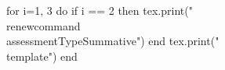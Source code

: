 \documentclass[twoside, 10pt]{article}
\title{}
\date{}
\newcommand{\assessmentType}{Formative}
\newcommand{\template}{
\directlua{tex.print(utils.genVersion())}
\noindent
{\large
First Name \rule{8em}{.4pt}\hspace{\stretch{1}} Last Name \rule{8em}{.4pt}\hspace{\stretch{1}} Date \rule{1.5em}{.4pt} -- \rule{1.5em}{.4pt} -- \rule{1.5em}{.4pt}\hspace{\stretch{1}} Period \rule{2em}{.4pt}\hspace{\stretch{1}}
}
\vspace{1em}

\noindent
\renewcommand{\arraystretch}{2}
\begin{tabular}{|l|l|l|}
\hline
\textbf{ARGUE}&\textbf{MODEL}&\textbf{BE PRECISE}\\
\hline
&&\\
\hline
\end{tabular}

\begin{enumerate}
\section*{\normalsize Be Precise.}
\item Let $p(x)$ and $d(x) \ne 0$ be polynomials. If $p(x) = q(x)\cdot d(x) + r(x)$, then when $p(x)$ is divided by $d(x)$, the quotient is \rule{3em}{0.4pt}, and the remainder is \rule{3em}{0.4pt}.
\item  The Remainder Theorem: The remainder of $p(x)$ divided by $(x-a)$ is \rule{4em}{0.4pt}.
\item A \textbf{rational function} is a quotient of two \rule{10em}{0.4pt}.
\item A \textbf{rational number} is a quotient of two  \rule{10em}{0.4pt}.
\item Complete the following exponent rules: Given $a > 0$,
\vspace{1em}

(a) 
$a^m \cdot a^n = \rule{3em}{0.4pt}.$\hspace{\stretch{1}}
(b) 
$a^{-n} = \rule{3em}{0.4pt}.$\hspace{\stretch{1}}
(c) 
$a^{\frac{1}{n}} = \rule{3em}{0.4pt}.$\hspace{\stretch{1}}
(d) 
$(a^m)^n = \rule{3em}{0.4pt}.$\hspace{\stretch{1}}
(e) 
$(ab)^n = \rule{3em}{0.4pt}.$
\item If $f(x) = (x-a)(x-b)(x-c)$, then the zeros of $f(x)$ are \rule{10em}{0.4pt}.

\section*{\normalsize Model. }
\item Choose one set of problems (either \textbf{Recap} or \textbf{Rebuild}) to solve. \textbf{Circle the label of the problem set.}
{\bf Rebuild:}
\begin{enumerate}
\item 
\directlua{x = utils.genRandom(2, 10); y = x + utils.genRandom(1,5); total = 0.25*x + 0.1*y;}
Josie has \$\directlua{tex.print(total)} in dimes and quarters. She has \directlua{tex.print(y-x)} more dimes than quarters. Establish an equation that can be used to determine $x$, the number of quarters she has.
\item Vince wants to rent a canoe while he is on vacation. The canoe rental company charges \$18 for the first hour and \$\directlua{price=toFix(utils.genRandom(10,20)/2, 2); tex.print(price)} for each additional hour, x. If Vince has \$78 to spend on renting a canoe, write an inequality in terms of $x$ that models this situation.
\end{enumerate}
{\bf Recap:}
\begin{enumerate}
\item \directlua{num=utils.genRandom(1, 9); den=utils.genRandom(num, 20)} Find the number that is $\displaystyle \frac{\directlua{tex.print(num)}}{\directlua{tex.print(den)}}$ less than its reciprocal. (Hint: recall that the reciprocal of $x$ is just $\displaystyle \frac{1}{x}$.
\end{enumerate}
{\bf Work Space:}

\begin{enumerate}
\item\ 
\vspace{\stretch{1}}
\item\ 
\vspace{\stretch{1}}
\end{enumerate}


\section*{\normalsize Argue. }
\item Choose one set of problems (either \textbf{Recap} or \textbf{Rebuild}) to solve. \textbf{Circle the label of the problem set.}

{\bf Rebuild:}
\begin{enumerate}
\item Given $a>0$,  express $\displaystyle \frac{\sqrt[3]{a}\cdot\sqrt[5]{a^2}}{\sqrt{a}}$ as a single power of $a$ .  Show all your work!
\item Solve the equation $14x = 3(1+2x)-4x$ for $x$.
\item Use the quadratic formula to solve $2x^2 - 4x - \directlua{tex.print(utils.genRandom(1,9))} = 0$, and express the answer in simplest radical form. Show all your work!
\item Find the remainder of $x^2 - x - 6$ divided by $x\directlua{tex.print(utils.genRandom(-9, 9, true, false, true))}$. Show all your work!
\item \directlua{a = utils.genRandom(-5,5, true, true, true)} Factor the binomial $x^2\directlua{tex.print(a)}x$ completely. Show all your work!
\end{enumerate}

\textbf{Recap:}
\begin{enumerate}
\item Finish the proof of the remainder theorem.

{\bf Proof:} Suppose $p(x) = q(x)(x-a) + r$, then 
\begin{align*}
p(a) & = q(\rule{2em}{0.4pt})(\rule{2em}{0.4pt} - a) + r\\
& = q(\rule{2em}{0.4pt})(\rule{2em}{0.4pt}) + r\\
&=\rule{2em}{0.4pt}
\end{align*}

\item Use the remainder theorem to determine if $x\directlua{tex.print(utils.genRandom(-3, 3, true, false, true))}$ is a factor of $x^3 - x^2 - x + 1$. Show all your work!
\item \directlua{a = utils.genRandom(-5,5); b = utils.genRandom(-5,5, false, false, -a);c = utils.genRandom(-5,5)} Factor the polynomial $(x\directlua{tex.print(utils.normalizeCoeff(c, true))})^2\directlua{tex.print(utils.normalizeCoeff(a+b, true))}(x\directlua{tex.print(utils.normalizeCoeff(c, true))})\directlua{tex.print(utils.normalizeCoeff(a*b, true))}$ completely. Show all your work!
\end{enumerate}
{\bf Work Space:}

\begin{enumerate}
\item\ 
\vspace{\stretch{1}}
\item\ 
\vspace{\stretch{1}}
\item\ 
\vspace{\stretch{1}}
\item\ 
\vspace{\stretch{1}}
\item\ 
\vspace{\stretch{1}}
\end{enumerate}
\end{enumerate}
\clearpage
}
\begin{document}
\begin{luacode*}
for i=1, 3 do
	if i == 2 then
		tex.print("\\renewcommand{\\assessmentType}{Summative}")
	end
	tex.print("\\template")
end
\end{luacode*}
\end{document}
